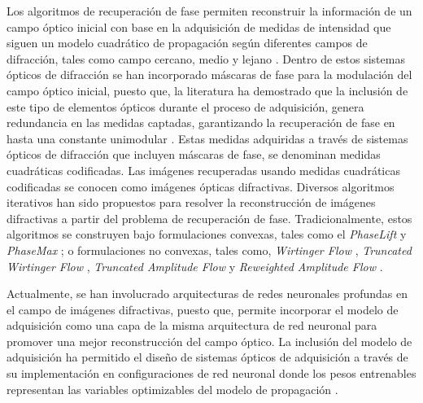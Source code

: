 Los algoritmos de recuperación de fase permiten reconstruir la información de un campo óptico inicial con base en la adquisición de medidas de intensidad que siguen un modelo cuadrático de propagación según diferentes campos de difracción, tales como campo cercano, medio y lejano \cite{goodman2005introduction}. Dentro de estos sistemas ópticos de difracción se han incorporado máscaras de fase para la modulación del campo óptico inicial, puesto que, la literatura ha demostrado que la inclusión de este tipo de elementos ópticos durante el proceso de adquisición, genera redundancia en las medidas captadas, garantizando la recuperación de fase en hasta una constante unimodular \cite{candes_CDP}. Estas medidas adquiridas a través de sistemas ópticos de difracción que incluyen máscaras de fase, se denominan medidas cuadráticas codificadas. Las imágenes recuperadas usando medidas cuadráticas codificadas se conocen como imágenes ópticas difractivas. Diversos algoritmos iterativos han sido propuestos para resolver la reconstrucción de imágenes difractivas a partir del problema de recuperación de fase. Tradicionalmente, estos algoritmos se construyen bajo formulaciones convexas, tales como el \textit{PhaseLift} \cite{candes2013phaselift} y \textit{PhaseMax} \cite{goldstein2018phasemax}; o formulaciones no convexas, tales como, \textit{Wirtinger Flow} \cite{candes2015phase}, \textit{Truncated Wirtinger Flow} \cite{chen2017solving}, \textit{Truncated Amplitude Flow} \cite{wang2017solving} y \textit{Reweighted Amplitude Flow} \cite{wang2018phase}.  

\newpage
Actualmente, se han involucrado arquitecturas de redes neuronales profundas en el campo de imágenes difractivas, puesto que, permite incorporar el modelo de adquisición como una capa de la misma arquitectura de red neuronal para promover una mejor reconstrucción del campo óptico. La inclusión del modelo de adquisición ha permitido el diseño de sistemas ópticos de adquisición a través de su implementación en configuraciones de red neuronal donde los pesos entrenables representan las variables optimizables del modelo de propagación \cite{cai2020learning}. 

